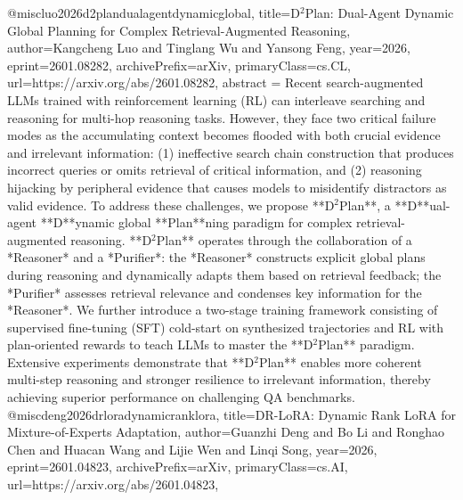 {}@misc{luo2026d2plandualagentdynamicglobal,
      title={D$^2$Plan: Dual-Agent Dynamic Global Planning for Complex Retrieval-Augmented Reasoning}, 
      author={Kangcheng Luo and Tinglang Wu and Yansong Feng},
      year={2026},
      eprint={2601.08282},
      archivePrefix={arXiv},
      primaryClass={cs.CL},
      url={https://arxiv.org/abs/2601.08282},
      abstract = {Recent search-augmented LLMs trained with reinforcement learning (RL) can interleave searching and reasoning for multi-hop reasoning tasks. However, they face two critical failure modes as the accumulating context becomes flooded with both crucial evidence and irrelevant information: (1) ineffective search chain construction that produces incorrect queries or omits retrieval of critical information, and (2) reasoning hijacking by peripheral evidence that causes models to misidentify distractors as valid evidence. To address these challenges, we propose **D$^2$Plan**, a **D**ual-agent **D**ynamic global **Plan**ning paradigm for complex retrieval-augmented reasoning. **D$^2$Plan** operates through the collaboration of a *Reasoner* and a *Purifier*: the *Reasoner* constructs explicit global plans during reasoning and dynamically adapts them based on retrieval feedback; the *Purifier* assesses retrieval relevance and condenses key information for the *Reasoner*. We further introduce a two-stage training framework consisting of supervised fine-tuning (SFT) cold-start on synthesized trajectories and RL with plan-oriented rewards to teach LLMs to master the **D$^2$Plan** paradigm. Extensive experiments demonstrate that **D$^2$Plan** enables more coherent multi-step reasoning and stronger resilience to irrelevant information, thereby achieving superior performance on challenging QA benchmarks.}
}@misc{deng2026drloradynamicranklora,
      title={DR-LoRA: Dynamic Rank LoRA for Mixture-of-Experts Adaptation}, 
      author={Guanzhi Deng and Bo Li and Ronghao Chen and Huacan Wang and Lijie Wen and Linqi Song},
      year={2026},
      eprint={2601.04823},
      archivePrefix={arXiv},
      primaryClass={cs.AI},
      url={https://arxiv.org/abs/2601.04823},
}
